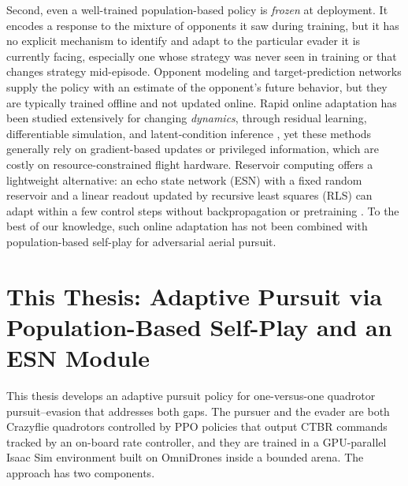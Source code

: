 Second, even a well-trained population-based policy is \emph{frozen} at deployment. It encodes a response to the mixture of opponents it saw during training, but it has no explicit mechanism to identify and adapt to the particular evader it is currently facing, especially one whose strategy was never seen in training or that changes strategy mid-episode. Opponent modeling \cite{tianMultiagentActorcriticTime2023} and target-prediction networks \cite{zhangGameDronesMultiUAV2023, chenOnlinePlanningMultiUAV2025} supply the policy with an estimate of the opponent's future behavior, but they are typically trained offline and not updated online. Rapid online adaptation has been studied extensively for changing \emph{dynamics}, through residual learning, differentiable simulation, and latent-condition inference \cite{panLearningFlyRapid2026, xingContinualRobotPolicy2026, pertinNSTRLResidualReinforcement2026, greenBridgingPerformanceGeneralization2026}, yet these methods generally rely on gradient-based updates or privileged information, which are costly on resource-constrained flight hardware. Reservoir computing offers a lightweight alternative: an echo state network (ESN) with a fixed random reservoir and a linear readout updated by recursive least squares (RLS) can adapt within a few control steps without backpropagation or pretraining \cite{yoshimuraOnlineAdaptiveReinforcement2026}. To the best of our knowledge, such online adaptation has not been combined with population-based self-play for adversarial aerial pursuit.

\section{This Thesis: Adaptive Pursuit via Population-Based Self-Play and an ESN Module}
\noindent
This thesis develops an adaptive pursuit policy for one-versus-one quadrotor pursuit--evasion that addresses both gaps. The pursuer and the evader are both Crazyflie quadrotors controlled by PPO policies \cite{yuSurprisingEffectivenessPPO} that output CTBR commands tracked by an on-board rate controller, and they are trained in a GPU-parallel Isaac Sim environment built on OmniDrones \cite{xuOmniDronesEfficientFlexible2023} inside a bounded arena. The approach has two components.


